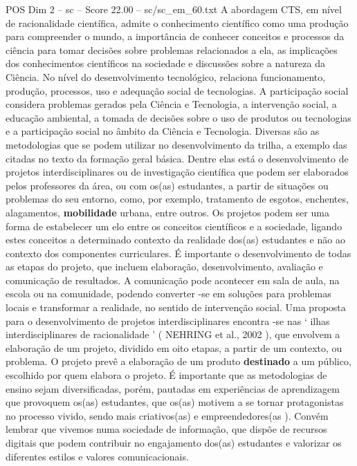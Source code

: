 \begin{textsample}{POS Dim 2 – sc – Score 22.00 – sc/sc\_em\_60.txt}
A abordagem CTS, em nível de racionalidade científica, admite o conhecimento científico como uma produção para compreender o mundo, a importância de conhecer conceitos e processos da ciência para tomar decisões sobre problemas relacionados a ela, as implicações dos conhecimentos científicos na sociedade e discussões sobre a natureza da Ciência.
No nível do desenvolvimento tecnológico, relaciona funcionamento, produção, processos, uso e adequação social de tecnologias.
A participação social considera problemas gerados pela Ciência e Tecnologia, a intervenção social, a educação ambiental, a tomada de decisões sobre o uso de produtos ou tecnologias e a participação social no âmbito da Ciência e Tecnologia.
Diversas são as metodologias que se podem utilizar no desenvolvimento da trilha, a exemplo das citadas no texto da formação geral básica.
Dentre elas está o desenvolvimento de projetos interdisciplinares ou de investigação científica que podem ser elaborados pelos professores da área, ou com os(as) estudantes, a partir de situações ou problemas do seu entorno, como, por exemplo, tratamento de esgotos, enchentes, alagamentos, \textbf{mobilidade} urbana, entre outros.
Os projetos podem ser uma forma de estabelecer um elo entre os conceitos científicos e a sociedade, ligando estes conceitos a determinado contexto da realidade dos(as) estudantes e não ao contexto dos componentes curriculares.
É importante o desenvolvimento de todas as etapas do projeto, que incluem elaboração, desenvolvimento, avaliação e comunicação de resultados.
A comunicação pode acontecer em sala de aula, na escola ou na comunidade, podendo converter -se em soluções para problemas locais e transformar a realidade, no sentido de intervenção social.
Uma proposta para o desenvolvimento de projetos interdisciplinares encontra -se nas ‘ ilhas interdisciplinares de racionalidade ’ ( NEHRING et al., 2002 ), que envolvem a elaboração de um projeto, dividido em oito etapas, a partir de um contexto, ou problema.
O projeto prevê a elaboração de um produto \textbf{destinado} a um público, escolhido por quem elabora o projeto.
É importante que as metodologias de ensino sejam diversificadas, porém, pautadas em experiências de aprendizagem que provoquem os(as) estudantes, que os(as) motivem a se tornar protagonistas no processo vivido, sendo mais criativos(as) e empreendedores(as ).
Convém lembrar que vivemos numa sociedade de informação, que dispõe de recursos digitais que podem contribuir no engajamento dos(as) estudantes e valorizar os diferentes estilos e valores comunicacionais.

\end{textsample}
